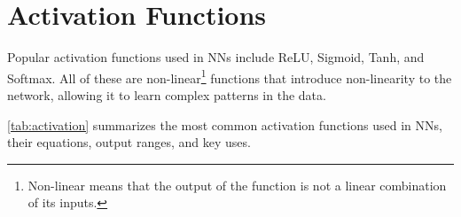 \documentclass[oneside,11pt,dvipsnames]{book}
\numberwithin{equation}{section}
\theoremstyle{definition}
\theoremstyle{remark}
\begin{document}




\section{Activation Functions}\label{sec:activation}
Popular activation functions used in NNs include ReLU, Sigmoid, Tanh, and Softmax. All of these are non-linear\footnote{Non-linear means that the output of the function is not a linear combination of its inputs.} functions that introduce non-linearity to the network, allowing it to learn complex patterns in the data.

\autoref{tab:activation} summarizes the most common activation functions used in NNs, their equations, output ranges, and key uses.
\end{document}

